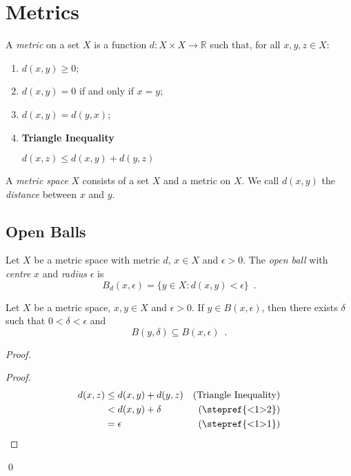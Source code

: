 \section{Metrics}

\begin{df}[Metric]
  A \emph{metric} on a set $X$ is a function $d : X \times X \rightarrow
  \mathbb{R}$ such that, for all $x, y, z \in X$:
  \begin{enumerate}
    \item $d(x, y) \geq 0$;
    \item $d(x, y) = 0$ if and only if $x = y$;
    \item $d(x, y) = d(y, x)$;
    \item \textbf{Triangle Inequality}

    $d(x, z) \leq d(x, y) + d(y, z)$
  \end{enumerate}
  A \emph{metric space} $X$ consists of a set $X$ and a metric on $X$. We
  call $d(x, y)$ the \emph{distance} between $x$ and $y$.
\end{df}

\subsection{Open Balls}

\begin{df}
  Let $X$ be a metric space with metric $d$, $x \in X$ and $\epsilon > 0$.
  The \emph{open       ball} with \emph{centre} $x$ and \emph{radius}
  $\epsilon$
  is
  \[ B_d(x, \epsilon) = \{ y \in X : d(x, y) < \epsilon \} \enspace . \]
\end{df}

\begin{lm}
  \label{lm:topology:metric:balls}
  Let $X$ be a metric space, $x, y \in X$ and $\epsilon > 0$. If $y \in B(x,
  \epsilon)$, then there exists $\delta$ such that $0 < \delta < \epsilon$ and
  \[ B(y, \delta) \subseteq B(x, \epsilon) \enspace . \]
\end{lm}

\begin{proof}
  \pf
  \begin{proof}
    \pf
    \begin{align*}
      d(x, z) & \leq d(x, y) + d(y, z) & (\text{Triangle Inequality}) \\
      & < d(x, y) + \delta & (\text{\stepref{<1>2}}) \\
      & = \epsilon & (\text{\stepref{<1>1}})
    \end{align*}
  \end{proof}
  \qed
\end{proof}

